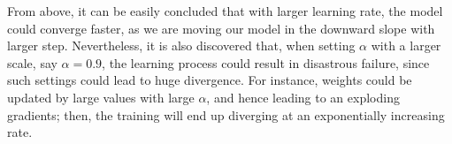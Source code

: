 \documentclass[a4paper,12pt]{article}
\begin{document}
\noindent From above, it can be easily concluded that with larger learning rate, 
the model could converge faster, as we are moving our model in the downward slope 
with larger step. 
Nevertheless, it is also discovered that, when setting $\alpha$ with a larger scale,
say $\alpha=0.9$, the learning process could result in disastrous failure,
since such settings could lead to huge divergence.
For instance, weights could be updated by large values with large $\alpha$, 
and hence leading to an exploding gradients;
then, the training will end up diverging at an exponentially increasing rate.

% 
\end{document}
